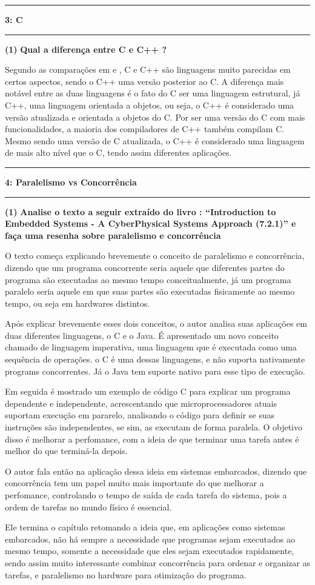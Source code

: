 \documentclass[11pt]{article}
\newcommand\question[2]{\vspace{.25in}\hrule\textbf{#1: #2}\vspace{.5em}\hrule\vspace{.10in}}
\renewcommand\part[1]{\vspace{.10in}\textbf{(#1)}}
\newcommand\differencec{\vspace{.10in}\textbf{Qual a diferença entre C e C++ ? }}
\newcommand\analise{\vspace{.10in}\textbf{Analise o texto a seguir extraído do livro : “Introduction to Embedded Systems - A CyberPhysical Systems Approach (7.2.1)” e faça uma resenha sobre paralelismo e concorrência}}
\begin{document}
\raggedright
\question{3}{C}


\part{1} \differencec

\RaggedRight
Segundo as comparações em \cite{difference_c_1} e \cite{difference_c_2}, C e C++ são linguagens muito parecidas em certos aspectos, sendo o C++ uma versão posterior ao C. A diferença mais notável entre as duas linguagens
é o fato do C ser uma linguagem estrutural, já C++, uma linguagem orientada a objetos, ou seja, o C++ é considerado uma versão atualizada e orientada a objetos do C.
Por ser uma versão do C com mais funcionalidades, a maioria dos compiladores de C++ também compilam C. Mesmo sendo uma versão de C atualizada, o C++ é
considerado uma linguagem de mais alto nível que o C, tendo assim diferentes aplicações.

\raggedright
\question{4}{Paralelismo vs Concorrência}

\part{1} \analise

\RaggedRight
O texto começa explicando brevemente o conceito de paralelismo e concorrência, dizendo que um programa concorrente seria aquele que diferentes partes
do programa são executadas ao mesmo tempo conceitualmente, já um programa paralelo seria aquele em que suas partes são executadas fisicamente ao mesmo tempo,
ou seja em hardwares distintos.

Após explicar brevemente esses dois conceitos, o autor analisa suas aplicações em duas diferentes linguagens, o C e o Java. É apresentado um novo conceito
chamado de linguagem imperativa, uma linguagem que é executada como uma sequência de operações. o C é uma dessas linguagens, e não suporta nativamente
programs concorrentes. Já o Java tem suporte nativo para esse tipo de execução.

Em seguida é mostrado um exemplo de código C para explicar um programa dependente e independente, acrescentando que microprocessadores atuais suportam
execução em pararelo, analisando o código para definir se suas instruções são independentes, se sim, as executam de forma paralela. O objetivo disso
é melhorar a perfomance, com a ideia de que terminar uma tarefa antes é melhor do que terminá-la depois.

O autor fala então na aplicação dessa ideia em sistemas embarcados, dizendo que concorrência tem um papel muito mais importante do que melhorar a
perfomance, controlando o tempo de saída de cada tarefa do sistema, pois a ordem de tarefas no mundo físico é essencial.

Ele termina o capítulo retomando a ideia que, em aplicações como sistemas embarcados, não há sempre a necessidade que programas sejam executados ao
mesmo tempo, somente a necessidade que eles sejam executados rapidamente, sendo assim muito interessante combinar concorrência para ordenar e organizar
as tarefas, e paralelismo no hardware para otimização do programa.

{}

\end{document}
